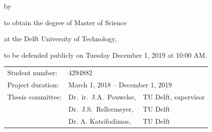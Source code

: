 \begin{titlepage}
	
	
	\begin{center}
		
		
		{\makeatletter
			\largetitlestyle\fontsize{64}{94}\selectfont\@title
			\makeatother}
		
		{\makeatletter
			\ifx\@subtitle\undefined\else
			\bigskip
			{\tudsffamily\fontsize{22}{32}\selectfont\@subtitle}    
			\fi
			\makeatother}
		
		\bigskip
		\bigskip
		
		by
		
		\bigskip
		\bigskip
		
		{\makeatletter
			\largetitlestyle\fontsize{26}{26}\selectfont\@author
			\makeatother}
		
		\bigskip
		\bigskip
		
		to obtain the degree of Master of Science
		
		at the Delft University of Technology,
		
		to be defended publicly on Tuesday December 1, 2019 at 10:00 AM.
		
		\vfill
		
		\begin{tabular}{lll}
			Student number: & 4294882 \\
			Project duration: & \multicolumn{2}{l}{March 1, 2018 -- December 1, 2019} \\
			Thesis committee: & Dr.\ ir.\  J.A.\ Pouwelse, & TU Delft, supervisor \\
			& Dr.\ J.S.\ Rellermeyer, & TU Delft \\
			& Dr. A. Katsifodimos, & TU Delft
		\end{tabular}
		
		\bigskip
		\bigskip
		

\end{center}
\end{titlepage}
